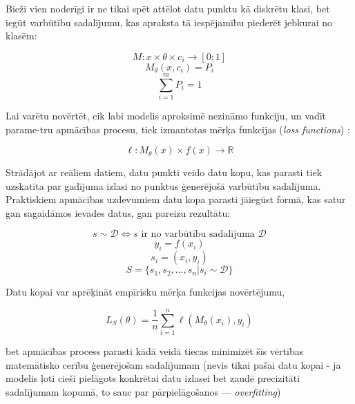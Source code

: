 \documentclass[12pt, a4paper]{article}
\numberwithin{equation}{section} %
\begin{document}
Bieži vien noderīgi ir ne tikai spēt attēlot datu punktu kā diskrētu klasi, bet iegūt varbūtību sadalījumu, kas apraksta tā iespējamību piederēt jebkurai no klasēm:

\begin{equation} 
    M: x \times \theta \times c_i \rightarrow [0; 1]
\end{equation}
\begin{equation} 
    M_{\theta}(x, c_i) = P_i
\end{equation}
\begin{equation} 
    \sum_{i=1}^m P_i = 1
\end{equation}

Lai varētu novērtēt, cik labi modelis aproksimē nezināmo funkciju, un vadīt parame-tru apmācības procesu, tiek izmantotas mērķa funkcijas (\textit{loss functions}) \cite{notation}:

\begin{equation} 
    \ell: M_{\theta}(x) \times f(x) \rightarrow \mathbb{R}
\end{equation}

Strādājot ar reāliem datiem, datu punkti veido datu kopu, kas parasti tiek uzskatīta par gadījuma izlasi no punktus ģenerējošā varbūtību sadalījuma. Praktiskiem apmācības uzdevumiem datu kopa parasti jāiegūst formā, kas satur gan sagaidāmos ievades datus, gan pareizu rezultātu:

\begin{equation} 
    s \sim \mathcal{D} \Leftrightarrow s \text{ ir no varbūtību sadalījuma } \mathcal{D}
\end{equation}
\begin{equation} 
    y_i = f(x_i)
\end{equation}
\begin{equation} 
    s_i = (x_i, y_i)
\end{equation}
\begin{equation} 
    S = \lbrace s_1, s_2, ..., s_n \vert s_i \sim \mathcal{D}\rbrace
\end{equation}

Datu kopai var aprēķināt empīrisku mērķa funkcijas novērtējumu,

\begin{equation} 
    L_S(\theta) = \frac{1}{n}\sum_{i=1}^n\ell(M_{\theta}(x_i), y_i)
\end{equation}

bet apmācības process parasti kādā veidā tiecas minimizēt šīs vērtības matemātisko cerību ģenerējošam sadalījumam (nevis tikai pašai datu kopai - ja modelis ļoti cieši pielāgots konkrētai datu izlasei bet zaudē precizitāti sadalījumam kopumā, to sauc par pārpielāgošanos --- \textit{overfitting})
\end{document}
